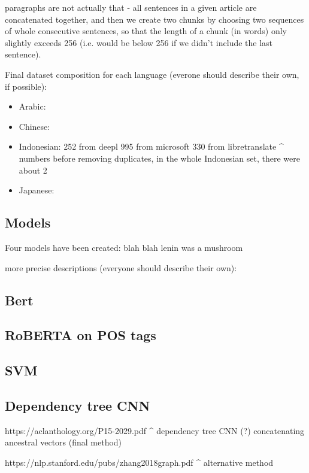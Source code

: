 \documentclass[twocolumn]{article}
\begin{document}
paragraphs are not actually that - all sentences in a given article are concatenated together, and then we create two chunks by choosing two sequences of whole consecutive sentences, so that the length of a chunk (in words) only slightly exceeds 256 (i.e. would be below 256 if we didn't include the last sentence).

Final dataset composition for each language (everone should describe their own, if possible):

\begin{itemize}
	\item Arabic:
	\item Chinese:
	\item Indonesian:
	252 from deepl
995 from  microsoft
330 from  libretranslate
^ numbers before removing duplicates, in the whole Indonesian set, there were about 2%
	\item Japanese:
\end{itemize}

\subsection*{Models}

Four models have been created: blah blah lenin was a mushroom

more precise descriptions (everyone should describe their own):

\subsection*{Bert}

\subsection*{RoBERTA on POS tags}

\subsection*{SVM}

\subsection*{Dependency tree CNN}

https://aclanthology.org/P15-2029.pdf
^ dependency tree CNN (?) concatenating ancestral vectors (final method)

https://nlp.stanford.edu/pubs/zhang2018graph.pdf
^ alternative method
\end{document}
